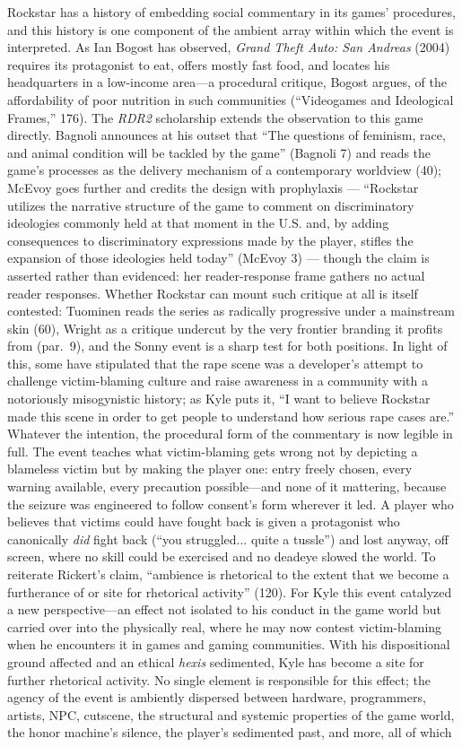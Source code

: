 \documentclass{article}
\begin{document}
Rockstar has a history of embedding social commentary in its games' procedures, and this history is one component of the ambient array within which the event is interpreted. As Ian Bogost has observed, \textit{Grand Theft Auto: San Andreas} (2004) requires its protagonist to eat, offers mostly fast food, and locates his headquarters in a low-income area---a procedural critique, Bogost argues, of the affordability of poor nutrition in such communities (``Videogames and Ideological Frames,'' 176).
The \textit{RDR2} scholarship extends the observation to this game directly. Bagnoli announces at his outset that ``The questions of feminism, race, and animal condition will be tackled by the game'' (Bagnoli 7) and reads the game's processes as the delivery mechanism of a contemporary worldview (40); McEvoy goes further and credits the design with prophylaxis — ``Rockstar utilizes the narrative structure of the game to comment on discriminatory ideologies commonly held at that moment in the U.S. and, by adding consequences to discriminatory expressions made by the player, stifles the expansion of those ideologies held today'' (McEvoy 3) — though the claim is asserted rather than evidenced: her reader-response frame gathers no actual reader responses. Whether Rockstar can mount such critique at all is itself contested: Tuominen reads the series as radically progressive under a mainstream skin (60), Wright as a critique undercut by the very frontier branding it profits from (par.\ 9), and the Sonny event is a sharp test for both positions. In light of this, some have stipulated that the rape scene was a developer's attempt to challenge victim-blaming culture and raise awareness in a community with a notoriously misogynistic history; as Kyle puts it, ``I want to believe Rockstar made this scene in order to get people to understand how serious rape cases are.'' Whatever the intention, the procedural form of the commentary is now legible in full. The event teaches what victim-blaming gets wrong not by depicting a blameless victim but by making the player one: entry freely chosen, every warning available, every precaution possible---and none of it mattering, because the seizure was engineered to follow consent's form wherever it led. A player who believes that victims could have fought back is given a protagonist who canonically \textit{did} fight back (``you struggled... quite a tussle'') and lost anyway, off screen, where no skill could be exercised and no deadeye slowed the world. To reiterate Rickert's claim, ``ambience is rhetorical to the extent that we become a furtherance of or site for rhetorical activity'' (120). For Kyle this event catalyzed a new perspective---an effect not isolated to his conduct in the game world but carried over into the physically real, where he may now contest victim-blaming when he encounters it in games and gaming communities. With his dispositional ground affected and an ethical \textit{hexis} sedimented, Kyle has become a site for further rhetorical activity. No single element is responsible for this effect; the agency of the event is ambiently dispersed between hardware, programmers, artists, NPC, cutscene, the structural and systemic properties of the game world, the honor machine's silence, the player's sedimented past, and more, all of which 
\end{document}
